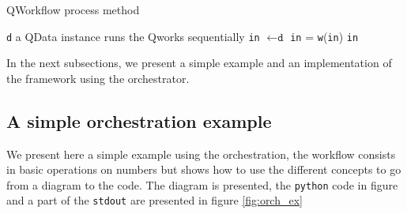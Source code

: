\documentclass[10pt, conference, compsocconf]{IEEEtran}
\begin{document}
\begin{algorithm}
\caption{QWorkflow process method}
\label{alg:Qworkflow}
\begin{algorithmic}
\REQUIRE \texttt{d} a QData instance
\ENSURE runs the Qworks sequentially
\STATE \texttt{in} $\leftarrow \texttt{d}$
\STATE \texttt{in} = \texttt{w}(\texttt{in})
\ENDFOR
\RETURN \texttt{in}
\end{algorithmic}
\end{algorithm}

In the next subsections, we present a simple example and an implementation of the framework using the orchestrator.
 
\subsection{A simple orchestration example}
We present here a simple example using the orchestration, the workflow consists in basic operations on numbers but shows how to use the different concepts to go from a diagram to the code. The diagram is presented, the \texttt{python} code in figure and a part of the \texttt{stdout} are presented in figure \ref{fig:orch_ex}
\end{document}
